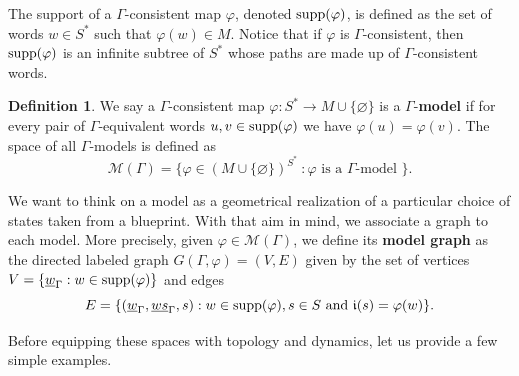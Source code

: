 \documentclass{article}
\theoremstyle{definition}
\newtheorem{defn}[theorem]{Definition} %
\theoremstyle{definition}
\newcommand{\M}{\mathcal{M}}
\newcommand{\init}{\mathfrak{i}}
\newcommand{\supp}{\textnormal{supp}}
\newcommand{\define}[1]{\textbf{#1}}
\begin{document}
The support of a $\Gamma$-consistent map $\varphi$, denoted $\supp(\varphi)$, is defined as the set of words $w\in S^*$ such that $\varphi(w)\in M$. Notice that if $\varphi$ is $\Gamma$-consistent, then $\supp(\varphi)$ is an infinite subtree of $S^*$ whose paths are made up of $\Gamma$-consistent words.


\begin{defn}
\label{def:model}
We say a $\Gamma$-consistent map $\varphi\colon S^{*} \to M\cup\{\varnothing\}$ is a $\Gamma$-\define{model} if for every pair of $\Gamma$-equivalent words $u,v\in \supp(\varphi)$ we have $\varphi(u) = \varphi(v)$. The space of all $\Gamma$-models is defined as
\[\M(\Gamma) = \{\varphi\in (M\cup \{\varnothing\})^{S^*}\
: \varphi \text{ is a $\Gamma$-model } \}.\]
\end{defn}

We want to think on a model as a geometrical realization of a particular choice of states taken from a blueprint. With that aim in mind, we associate a graph to each model. More precisely, given $\varphi\in\M(\Gamma)$, we define its \define{model graph} as the directed labeled graph $G(\Gamma, \varphi) = (V,E)$ given by the set of vertices $V = \{ \underline{w}_{\Gamma} : w\in \supp(\varphi)\}$ and edges \[E = \{ (\underline{w}_{\Gamma}, \underline{ws}_{\Gamma}, s) : w \in \supp(\varphi), s\in S \mbox{ and } \init(s) = \varphi(w)\}.\] 

Before equipping these spaces with topology and dynamics, let us provide a few simple examples.
\end{document}
